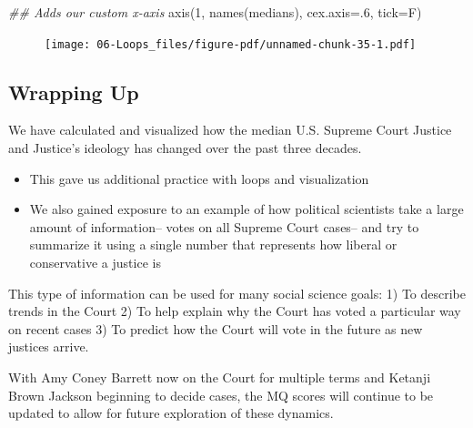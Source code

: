 \documentclass[
  letterpaper,
  DIV=11,
  numbers=noendperiod]{scrreprt}
\newenvironment{Shaded}{\begin{snugshade}}{\end{snugshade}}
\newcommand{\AttributeTok}[1]{\textcolor[rgb]{0.40,0.45,0.13}{#1}}
\newcommand{\DecValTok}[1]{\textcolor[rgb]{0.68,0.00,0.00}{#1}}
\newcommand{\DocumentationTok}[1]{\textcolor[rgb]{0.37,0.37,0.37}{\textit{#1}}}
\newcommand{\FunctionTok}[1]{\textcolor[rgb]{0.28,0.35,0.67}{#1}}
\newcommand{\NormalTok}[1]{\textcolor[rgb]{0.00,0.23,0.31}{#1}}
\providecommand{\tightlist}{%
  \setlength{\itemsep}{0pt}\setlength{\parskip}{0pt}}\usepackage{longtable,booktabs,array}
\begin{document}
\begin{Shaded}
\begin{Highlighting}[]
\DocumentationTok{\#\# Adds our custom x{-}axis}
\FunctionTok{axis}\NormalTok{(}\DecValTok{1}\NormalTok{, }\FunctionTok{names}\NormalTok{(medians), }\AttributeTok{cex.axis=}\NormalTok{.}\DecValTok{6}\NormalTok{, }\AttributeTok{tick=}\NormalTok{F)}
\end{Highlighting}
\end{Shaded}

\begin{figure}[H]

{\centering \texttt{[image: 06-Loops\_files/figure-pdf/unnamed-chunk-35-1.pdf]}

}

\end{figure}

\hypertarget{wrapping-up}{%
\subsection{Wrapping Up}\label{wrapping-up}}

We have calculated and visualized how the median U.S. Supreme Court
Justice and Justice's ideology has changed over the past three decades.

\begin{itemize}
\tightlist
\item
  This gave us additional practice with loops and visualization
\item
  We also gained exposure to an example of how political scientists take
  a large amount of information-- votes on all Supreme Court cases-- and
  try to summarize it using a single number that represents how liberal
  or conservative a justice is
\end{itemize}

This type of information can be used for many social science goals: 1)
To describe trends in the Court 2) To help explain why the Court has
voted a particular way on recent cases 3) To predict how the Court will
vote in the future as new justices arrive.

With Amy Coney Barrett now on the Court for multiple terms and Ketanji
Brown Jackson beginning to decide cases, the MQ scores will continue to
be updated to allow for future exploration of these dynamics.
\end{document}

